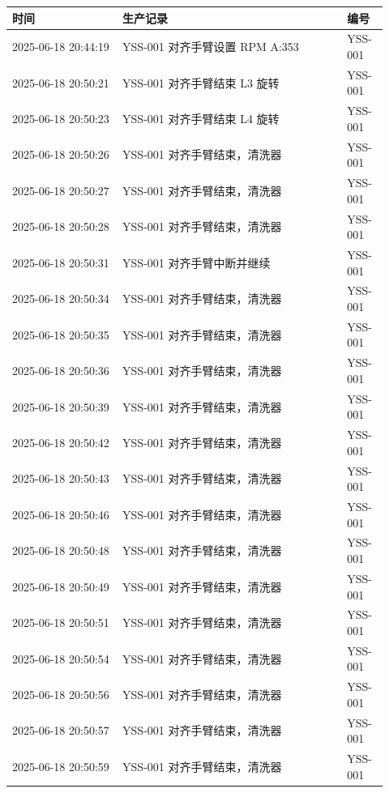 \documentclass[UTF8,10pt,a4paper,fontset=fandol]{ctexart}
\begin{document}
\begin{center}
\small
\begin{tabular}{|p{0.27\linewidth}|p{0.55\linewidth}|p{0.10\linewidth}|}
\hline
\textbf{时间} & \textbf{生产记录} & \textbf{编号} \\ \hline
2025-06-18 20:44:19 & YSS-001 对齐手臂设置 RPM A:353 & YSS-001 \\ \hline
2025-06-18 20:50:21 & YSS-001 对齐手臂结束 L3 旋转 & YSS-001 \\ \hline
2025-06-18 20:50:23 & YSS-001 对齐手臂结束 L4 旋转 & YSS-001 \\ \hline
2025-06-18 20:50:26 & YSS-001 对齐手臂结束，清洗器 & YSS-001 \\ \hline
2025-06-18 20:50:27 & YSS-001 对齐手臂结束，清洗器 & YSS-001 \\ \hline
2025-06-18 20:50:28 & YSS-001 对齐手臂结束，清洗器 & YSS-001 \\ \hline
2025-06-18 20:50:31 & YSS-001 对齐手臂中断并继续 & YSS-001 \\ \hline
2025-06-18 20:50:34 & YSS-001 对齐手臂结束，清洗器 & YSS-001 \\ \hline
2025-06-18 20:50:35 & YSS-001 对齐手臂结束，清洗器 & YSS-001 \\ \hline
2025-06-18 20:50:36 & YSS-001 对齐手臂结束，清洗器 & YSS-001 \\ \hline
2025-06-18 20:50:39 & YSS-001 对齐手臂结束，清洗器 & YSS-001 \\ \hline
2025-06-18 20:50:42 & YSS-001 对齐手臂结束，清洗器 & YSS-001 \\ \hline
2025-06-18 20:50:43 & YSS-001 对齐手臂结束，清洗器 & YSS-001 \\ \hline
2025-06-18 20:50:46 & YSS-001 对齐手臂结束，清洗器 & YSS-001 \\ \hline
2025-06-18 20:50:48 & YSS-001 对齐手臂结束，清洗器 & YSS-001 \\ \hline
2025-06-18 20:50:49 & YSS-001 对齐手臂结束，清洗器 & YSS-001 \\ \hline
2025-06-18 20:50:51 & YSS-001 对齐手臂结束，清洗器 & YSS-001 \\ \hline
2025-06-18 20:50:54 & YSS-001 对齐手臂结束，清洗器 & YSS-001 \\ \hline
2025-06-18 20:50:56 & YSS-001 对齐手臂结束，清洗器 & YSS-001 \\ \hline
2025-06-18 20:50:57 & YSS-001 对齐手臂结束，清洗器 & YSS-001 \\ \hline
2025-06-18 20:50:59 & YSS-001 对齐手臂结束，清洗器 & YSS-001 \\ \hline

\end{tabular}
\end{center}
\end{document}
